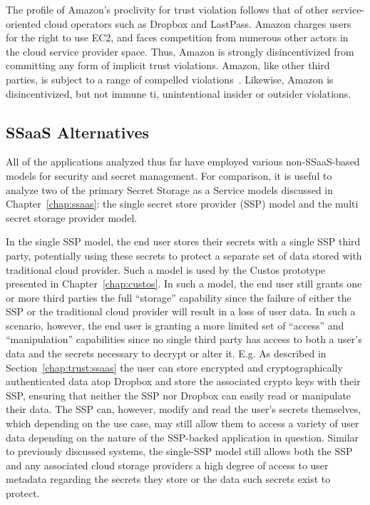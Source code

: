 The profile of Amazon's proclivity for trust violation follows that of
other service-oriented cloud operators such as Dropbox and
LastPass. Amazon charges users for the right to use EC2, and faces
competition from numerous other actors in the cloud service provider
space. Thus, Amazon is strongly disincentivized from committing any
form of implicit trust violations. Amazon, like other third parties,
is subject to a range of compelled
violations~\cite{amazon-transparency}. Likewise, Amazon is
disincentivized, but not immune ti, unintentional insider or outsider
violations.

\subsection{SSaaS Alternatives}

All of the applications analyzed thus far have employed various
non-SSaaS-based models for security and secret management. For
comparison, it is useful to analyze two of the primary Secret Storage
as a Service models discussed in Chapter~\ref{chap:ssaas}: the single
secret store provider (SSP) model and the multi secret storage
provider model.

In the single SSP model, the end user stores their secrets with a
single SSP third party, potentially using these secrets to protect a
separate set of data stored with traditional cloud provider. Such a
model is used by the Custos prototype presented in
Chapter~\ref{chap:custos}. In such a model, the end user still grants
one or more third parties the full ``storage'' capability since the
failure of either the SSP or the traditional cloud provider will
result in a loss of user data. In such a scenario, however, the end
user is granting a more limited set of ``access'' and ``manipulation''
capabilities since no single third party has access to both a user's
data and the secrets necessary to decrypt or alter it. E.g. As
described in Section~\ref{chap:trust:ssaas} the user can store
encrypted and cryptographically authenticated data atop Dropbox and
store the associated crypto keys with their SSP, ensuring that neither
the SSP nor Dropbox can easily read or manipulate their data. The SSP
can, however, modify and read the user's secrets themselves, which
depending on the use case, may still allow them to access a variety of
user data depending on the nature of the SSP-backed application in
question. Similar to previously discussed systems, the single-SSP
model still allows both the SSP and any associated cloud storage
providers a high degree of access to user metadata regarding the
secrets they store or the data such secrets exist to protect.

